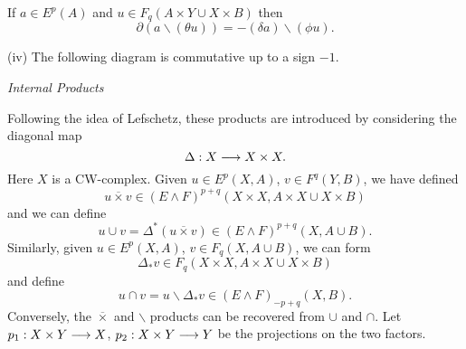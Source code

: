 \documentclass[../main]{subfiles}
\begin{document}
\begin{theorem}
\begin{enumerate}
If $a \in E^p(A)$ and $u \in F_q(A \times Y \cup X \times B)$ then $$\partial(a \backslash (\theta u)) = -(\delta a) \backslash (\phi u).$$

(iv) The following diagram is commutative up to a sign $-1$.\\
 {
}
\end{enumerate}
\end{theorem}

\emph{Internal Products}

Following the idea of Lefschetz, these products are introduced by considering the diagonal map $$\Delta : X \overset{}{\longrightarrow} X \times X.$$ Here $X$ is a CW-complex. Given $u \in E^p(X, A)$, $v \in F^q(Y, B)$, we have defined $$u \overline \times v \in (E \wedge F)^{p + q}(X \times X, A \times X \cup X \times B)$$ and we can define $$u \cup v = \Delta^\ast (u \overline \times v) \in (E \wedge F)^{p + q}(X, A \cup B).$$ Similarly, given $u \in E^p(X, A)$, $v \in F_q(X, A \cup B)$, we can form $$\Delta_\ast v \in F_q(X \times X, A \times X \cup X \times B)$$ and define $$u \cap v = u \backslash \Delta_\ast v \in (E \wedge F)_{-p + q} (X, B).$$ Conversely, the $\overline \times$ and $\backslash$ products can be recovered from $\cup$ and $\cap$. Let $p_1 : X \times Y \overset{}{\longrightarrow} X$, $p_2 : X \times Y \overset{}{\longrightarrow} Y$ be the projections on the two factors.
\end{document}

